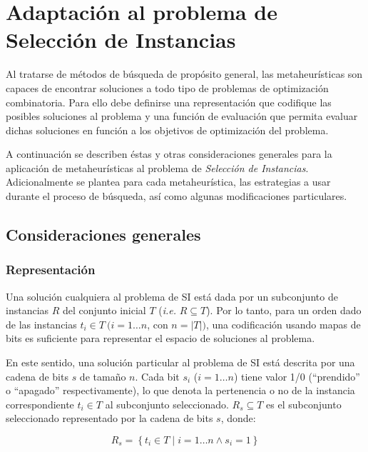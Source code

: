 \chapter{Adaptación al problema de Selección de Instancias}
\label{capitulo3}

Al tratarse de métodos de búsqueda de propósito general, las metaheurísticas son capaces de encontrar soluciones a todo tipo de problemas de optimización combinatoria. Para ello debe definirse una representación que codifique las posibles soluciones al problema y una función de evaluación que permita evaluar dichas soluciones en función a los objetivos de optimización del problema.

A continuación se describen éstas y otras consideraciones generales para la aplicación de metaheurísticas al problema de \emph{Selección de Instancias}. Adicionalmente se plantea para cada metaheurística, las estrategias a usar durante el proceso de búsqueda, así como algunas modificaciones particulares.

\section{Consideraciones generales}

\subsection{Representación}

Una solución cualquiera al problema de SI está dada por un subconjunto de instancias $R$ del conjunto inicial $T$ (\emph{i.e.} $R \subseteq T$). Por lo tanto, para un orden dado de las instancias $t_i \in T\ (i = 1 \dots n$, con $n = \vert T \vert)$, una codificación usando mapas de bits es suficiente para representar el espacio de soluciones al problema.

En este sentido, una solución particular al problema de SI está descrita por una cadena de bits $s$ de tamaño $n$. Cada bit $s_i$ ($i = 1 \dots n$) tiene valor 1/0 (``prendido'' o ``apagado'' respectivamente), lo que denota la pertenencia o no de la instancia correspondiente $t_i \in T$ al subconjunto seleccionado. $R_s \subseteq T$ es el subconjunto seleccionado representado por la cadena de bits $s$, donde:

\begin{equation}
R_s = \left\lbrace t_i \in T \mid i = 1 \dots n \land s_i = 1 \right\rbrace
\end{equation}

